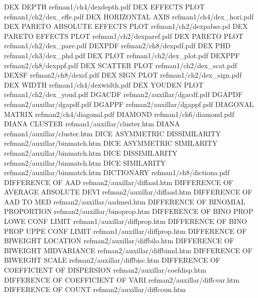 DEX DEPTH                               refman1/ch4/dexdepth.pdf
DEX EFFECTS PLOT                        refman1/ch2/dex_effe.pdf
DEX HORIZONTAL AXIS                     refman1/ch4/dex_hori.pdf
DEX PARETO ABSOLUTE EFFECTS PLOT        refman1/ch2/dexpabse.pd
DEX PARETO EFFECTS PLOT                 refman1/ch2/dexparef.pdf
DEX PARETO PLOT                         refman1/ch2/dex_pare.pdf
DEXPDF                                  refman2/ch8/dexpdf.pdf
DEX PHD                                 refman1/ch3/dex_phd.pdf
DEX PLOT                                refman1/ch2/dex_plot.pdf
DEXPPF                                  refman2/ch8/dexppf.pdf
DEX SCATTER PLOT                        refman1/ch2/dex_scat.pdf
DEXSF                                   refman2/ch8/dexsf.pdf
DEX SIGN PLOT                           refman1/ch2/dex_sign.pdf
DEX WIDTH                               refman1/ch4/dexwidth.pdf
DEX YOUDEN PLOT                         refman1/ch2/dex_youd.pdf
DGACDF                                  refman2/auxillar/dgacdf.pdf
DGAPDF                                  refman2/auxillar/dgapdf.pdf
DGAPPF                                  refman2/auxillar/dgappf.pdf
DIAGONAL MATRIX                         refman2/ch4/diagonal.pdf
DIAMOND                                 refman1/ch6/diamond.pdf
DIANA CLUSTER                           refman1/auxillar/cluster.htm
DIANA                                   refman1/auxillar/cluster.htm
DICE ASYMMETRIC DISSIMILARITY           refman2/auxillar/binmatch.htm
DICE ASYMMETRIC SIMILARITY              refman2/auxillar/binmatch.htm
DICE DISSIMILARITY                      refman2/auxillar/binmatch.htm
DICE SIMILARITY                         refman2/auxillar/binmatch.htm
DICTIONARY                              refman1/ch8/dictiona.pdf
DIFFERENCE OF AAD                       refman2/auxillar/diffaad.htm
DIFFERENCE OF AVERAGE ABSOLUTE DEVI     refman2/auxillar/diffaad.htm
DIFFERENCE OF AAD TO MED                refman2/auxillar/aadmed.htm
DIFFERENCE OF BINOMIAL PROPORTION       refman2/auxillar/binoprop.htm
DIFFERENCE OF BINO PROP LOWE CONF LIMIT refman1/auxillar/diffprop.htm
DIFFERENCE OF BINO PROP UPPE CONF LIMIT refman1/auxillar/diffprop.htm
DIFFERENCE OF BIWEIGHT LOCATION         refman2/auxillar/diffbilo.htm
DIFFERENCE OF BIWEIGHT MIDVARIANCE      refman2/auxillar/diffbimd.htm
DIFFERENCE OF BIWEIGHT SCALE            refman2/auxillar/diffbisc.htm
DIFFERENCE OF COEFFICIENT OF DISPERSION refman2/auxillar/coefdisp.htm
DIFFERENCE OF COEFFICIENT OF VARI       refman2/auxillar/diffcvar.htm
DIFFERENCE OF COUNT                     refman2/auxillar/diffcoun.htm
